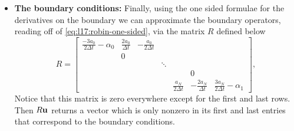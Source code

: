 \begin{itemize}
    write \eqref{eq:l17:diffusion-op} in matrix form 
    by ignoring the boundary terms once more, 
    \begin{equation*}
        (a u')'(t_j) \approx (A \ub)_j, \qquad 
        A = \frac{1}{\Delta t^2} 
        \begin{bmatrix}
            0         &                          &                              &                              &              \\
            a_{1/2}   & -(a_{1/2} + a_{3/2})     & a_{3/2}                      &                              &              \\
                      & \ddots                   & \ddots                       & \ddots                       &              \\
                      &                          & a_{N-3/2}                    & -(a_{N-3/2} + a_{N-1/2})     & a_{N-1/2}    \\
                      &                          &                              &                              & 0
        \end{bmatrix}
    \end{equation*}
    \item {\bf The boundary conditions:} Finally, using the 
    one sided formulae for the derivatives on the boundary
    we can approximate the boundary operators, reading off of
     \eqref{eq:l17:robin-one-sided}, 
     via the matrix $R$ defined below
    \begin{equation*}
        R = 
        \begin{bmatrix}
            \frac{-3 a_0}{2 \Delta t} - \alpha_0 & \frac{2 a_0}{\Delta t} & -\frac{a_0}{2 \Delta t} &        &                        &                          &                                       \\[4pt]
                                                & 0                      &                         &        &                        &                          &                                       \\
                                                &                        &                         & \ddots &                        &                          &                                       \\
                                                &                        &                         &        &                        & 0                        &                                       \\[2pt]
                                                &                        &                         &        & \frac{a_N}{2 \Delta t} & -\frac{2 a_N}{\Delta t}  & \frac{3 a_N}{2 \Delta t} - \alpha_1
        \end{bmatrix},
    \end{equation*}
    Notice that this matrix is zero everywhere
     except for the first and last rows. 
    Then $R \mathbf{u}$ returns a vector which is only 
    nonzero in its first and last entries that 
    correspond to the boundary conditions. 
\end{itemize}
